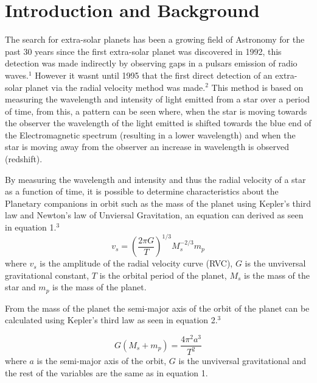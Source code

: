 \documentclass[]{article}
\begin{document}
\section*{Introduction and Background}
The search for extra-solar planets has been a growing field of Astronomy for the 
past 30 years since the first extra-solar planet was discovered in 1992, this 
detection was made indirectly by observing gaps in a pulsars emission of radio waves.$^1 $
However it wasnt until 1995 that the first direct detection of an extra-solar planet 
via the radial velocity method was made.$^2$ This method is based on measuring the 
wavelength and intensity of light emitted from a star over a period of time, 
from this, a pattern can be seen where, when the star is moving towards the observer
the wavelength of the light emitted is shifted towards the blue end of the 
Electromagnetic spectrum 
(resulting in a lower wavelength) and when the star is moving away from the observer
an increase in wavelength is observed (redshift). 
\par
By measuring the wavelength and intensity and thus the radial velocity of a star as 
a function of time, it is possible to determine characteristics about the Planetary
companions in orbit such as the mass of the planet using Kepler's third law and Newton's
law of Unviersal Gravitation, an equation can derived as seen in equation 1.$^3$
\begin{equation}\label{eq:mass of planet eq}
  v_s = \left(\frac{2\pi G}{T}\right)^{1/3}M_s^{-2/3}m_p
\end{equation}
where $v_s$ is the amplitude of the radial velocity curve (RVC), $G$ is the unviversal
gravitational constant, $T$ is the orbital period of the planet, $M_s$ is the mass of
the star and $m_p$ is the mass of the planet.
\par
From the mass of the planet the semi-major axis of the orbit of the planet can be 
calculated using Kepler's third law as seen in equation 2.$^3$

\begin{equation}\label{eq:semi-major axis eq}
  G(M_s+m_p) = \frac{4\pi^2a^3}{T^2}
\end{equation}
where $a$ is the semi-major axis of the orbit, $G$ is the unviversal gravitational
and the rest of the variables are the same as in equation 1.
\par
\end{document}
